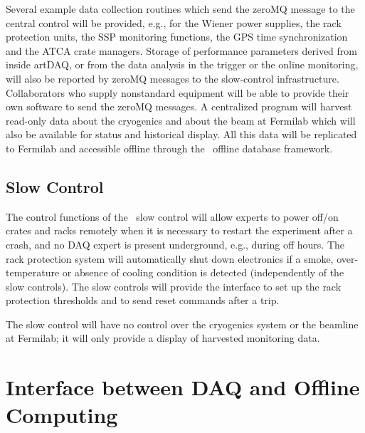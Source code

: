 Several example data collection routines which send the zeroMQ message
to the central control will be provided, e.g., for the Wiener power
supplies, the rack protection units, the SSP monitoring functions, the
GPS time synchronization and the ATCA crate managers.  Storage of
performance parameters derived from inside artDAQ, or from the data
analysis in the trigger or the online monitoring, will also be reported
by zeroMQ messages to the slow-control infrastructure.  Collaborators
who supply nonstandard equipment will be able to provide their own
software to send the zeroMQ messages.  A centralized program will
harvest read-only data about the cryogenics and about the beam at
Fermilab which will also be available for status and historical
display.  All this data will be replicated to Fermilab and accessible
offline through the \LBNE\ offline database framework.


\subsection{Slow Control}

The control functions of the \LBNE\ slow control will allow experts to
power off/on crates and racks remotely when it is necessary 
to restart the experiment after a crash, and no DAQ expert is present underground, e.g., during off hours.  The rack protection
system will automatically shut
down electronics if a smoke, over-temperature or absence of cooling
condition is detected  (independently of the slow controls).  The slow controls will provide the interface
to set up the rack protection thresholds and to send reset commands
after a trip.

The slow control will have no control over the cryogenics system or the beamline at Fermilab; it will only provide a display of harvested monitoring data.



\section{Interface between DAQ and Offline Computing}
\label{sec:daq_offline}


